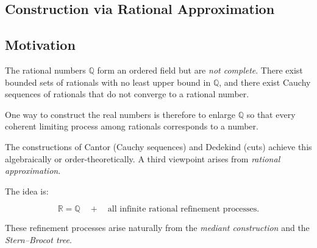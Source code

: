 
\subsection{Construction via Rational Approximation}

\subsection*{Motivation}

\begin{exposition}
The rational numbers $\mathbb{Q}$ form an ordered field but are
\emph{not complete}. There exist bounded sets of rationals with no
least upper bound in $\mathbb{Q}$, and there exist Cauchy sequences
of rationals that do not converge to a rational number.
\end{exposition}

\begin{exposition}
One way to construct the real numbers is therefore to enlarge
$\mathbb{Q}$ so that every coherent limiting process among
rationals corresponds to a number.
\end{exposition}

\begin{exposition}
The constructions of Cantor (Cauchy sequences) and Dedekind
(cuts) achieve this algebraically or order-theoretically.
A third viewpoint arises from \emph{rational approximation}.
\end{exposition}

\begin{exposition}
The idea is:
\end{exposition}

\begin{exposition}
\[
\mathbb{R}
=
\mathbb{Q}
\quad+\quad
\text{all infinite rational refinement processes}.
\]
\end{exposition}

\begin{exposition}
These refinement processes arise naturally from the
\emph{mediant construction} and the \emph{Stern--Brocot tree}.
\end{exposition}

\begin{exposition}
\bigskip
\end{exposition}

